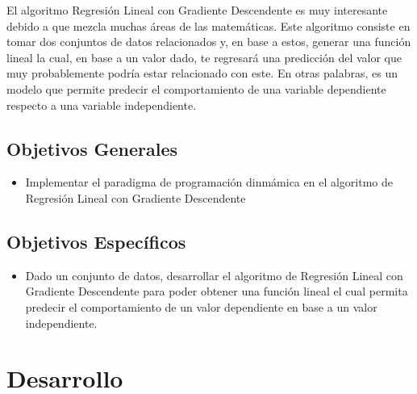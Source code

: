 \documentclass[12pt, a4paper]{article} %
\begin{document}
El algoritmo Regresión Lineal con Gradiente Descendente es muy interesante debido a que mezcla muchas áreas de las matemáticas. Este algoritmo consiste en tomar dos conjuntos de datos relacionados y, en base a estos, generar una función lineal la cual, en base a un valor dado, te regresará una predicción del valor que muy probablemente podría estar relacionado con este. En otras palabras, es un modelo que permite predecir el comportamiento de una variable dependiente respecto a una variable independiente.

\subsection{Objetivos Generales}

\begin{itemize}
	\item Implementar el paradigma de programación dinmámica en el algoritmo de Regresión Lineal con Gradiente Descendente
\end{itemize}

\subsection{Objetivos Específicos}

\begin{itemize}
	\item Dado un conjunto de datos, desarrollar el algoritmo de Regresión Lineal con Gradiente Descendente para poder obtener una función lineal el cual permita predecir el comportamiento de un valor dependiente en base a un valor independiente.
\end{itemize}

\section{Desarrollo}
\end{document}
